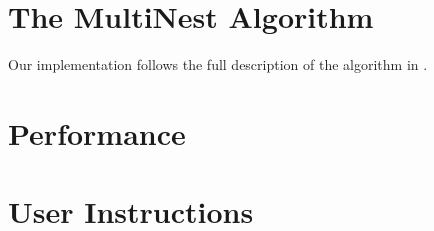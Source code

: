 \documentclass{article}
\begin{document}
\section{The MultiNest Algorithm}
Our implementation follows the full description of the algorithm in \cite{2009MNRAS.398.1601F}.
\section{Performance}
\section{User Instructions}



\end{document}
